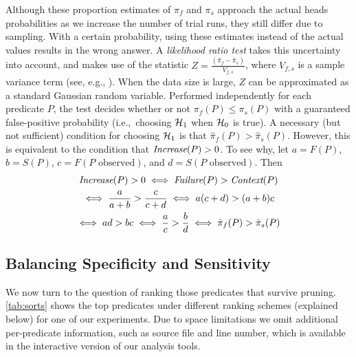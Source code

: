 Although these proportion estimates of $\pi_f$ and $\pi_s$ approach the
actual heads probabilities as we increase the number of trial runs, they
still differ due to sampling.  With a certain probability, using these
estimates instead of the actual values results in the wrong
answer.  A \textit{likelihood ratio test} takes this uncertainty into
account, and makes use of the statistic $ Z = \frac{(\hat \pi_f - \hat
  \pi_s)}{V_{f,s}}$, where $V_{f,s}$ is a sample variance term (see,
e.g., \cite{Lehmann:1986:hyptest}).  When
the data size is large, $Z$ can be approximated as a standard Gaussian
random variable.  Performed independently for each predicate $P$, the
test decides whether or not $\pi_f(P) \leq \pi_s(P)$ with a guaranteed
false-positive probability (i.e.,\ choosing ${\mathcal{H}}_1$ when ${\mathcal{H}}_0$ is true).
A necessary (but not sufficient) condition for choosing ${\mathcal{H}}_1$ is that
$\hat \pi_f(P) > \hat \pi_s(P)$.  However, this is
equivalent to the condition that $\textit{Increase}(P) > 0$.  To see why,
let $a = F(P)$, $b = S(P)$, $c = F(\text{$P$ observed})$, and $d =
S(\text{$P$ observed})$.
Then
\begin{gather*}
  \textit{Increase}(P) > 0 \iff \textit{Failure}(P) > \textit{Context}(P) \\
  \iff \frac{a}{a+b} > \frac{c}{c+d}
  \iff a (c+d) > (a+b) c \\
  \iff ad > bc \iff \frac{a}{c} > \frac{b}{d}
  \iff \hat \pi_f(P) > \hat \pi_s(P)
\end{gather*}

\subsection{Balancing Specificity and Sensitivity}
\label{sec:ranking}



\newlength{\textsegwidth}
\setlength{\textsegwidth}{2ex}
\newcommand{\textseg}[1]{\parbox{\textsegwidth}{\segment{#1}{\textsegwidth}}}

We now turn to the question of ranking those predicates that survive
pruning.  \autoref{tab:sorts} shows the top predicates under different
ranking schemes (explained below) for one of our experiments.  Due to
space limitations we omit additional per-predicate information, such
as source file and line number, which is available in the interactive
version of our analysis tools.

